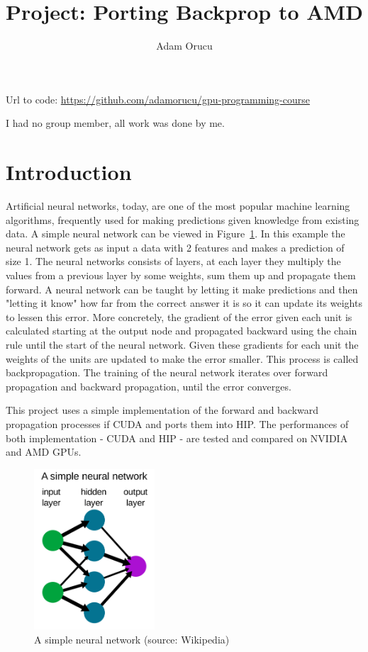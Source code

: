 \documentclass[a4paper,11pt]{scrartcl}
\title{Project: Porting Backprop to AMD}
\author{Adam Orucu}
\begin{document}
\maketitle

Url to code: \url{https://github.com/adamorucu/gpu-programming-course}

I had no group member, all work was done by me.

\section{Introduction}
Artificial neural networks, today, are one of the most popular machine learning algorithms, frequently used for making predictions given knowledge from existing data. A simple neural network can be viewed in Figure~\ref{fig:nn}. In this example the neural network gets as input a data with 2 features and makes a prediction of size 1. The neural networks consists of layers, at each layer they multiply the values from a previous layer by some weights, sum them up and propagate them forward. A neural network can be taught by letting it make predictions and then "letting it know" how far from the correct answer it is so it can update its weights to lessen this error. More concretely, the gradient of the error given each unit is calculated starting at the output node and propagated backward using the chain rule until the start of the neural network. Given these gradients for each unit the weights of the units are updated to make the error smaller. This process is called backpropagation. The training of the neural network iterates over forward propagation and backward propagation, until the error converges.

This project uses a simple implementation of the forward and backward propagation processes if CUDA and ports them into HIP. The performances of both implementation - CUDA and HIP - are tested and compared on NVIDIA and AMD GPUs.

\begin{figure}[h]
  \centering
\includegraphics*[width=0.4\textwidth]{images/nn.png}
  \caption{A simple neural network (source: Wikipedia)}
  \label{fig:nn}
\end{figure}
\end{document}
